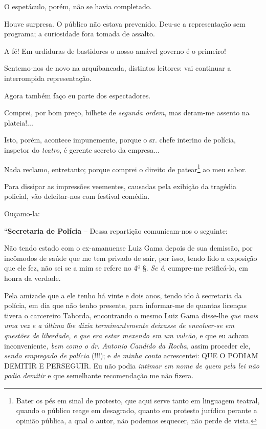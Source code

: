 O espetáculo, porém, não se havia completado.

Houve surpresa. O público não estava prevenido. Deu-se a representação
sem programa; a curiosidade fora tomada de assalto.

A fé! Em urdiduras de bastidores o nosso amável governo é o primeiro!

Sentemo-nos de novo na arquibancada, distintos leitores: vai continuar a
interrompida representação.

Agora também faço eu parte dos espectadores.

Comprei, por bom preço, bilhete de \emph{segunda ordem}, mas deram-me
assento na plateia!...

Isto, porém, acontece impunemente, porque o sr. chefe interino de
polícia, inspetor do \emph{teatro}, é gerente secreto da empresa...

Nada reclamo, entretanto; porque comprei o direito de patear\footnote{
  Bater os pés em sinal de protesto, que aqui serve tanto em linguagem
  teatral, quando o público reage em desagrado, quanto em protesto
  jurídico perante a opinião pública, a qual o autor, não podemos
  esquecer, não perde de vista.} ao meu sabor.

Para dissipar as impressões veementes, causadas pela exibição da
tragédia policial, vão deleitar-nos com festival comédia.

Ouçamo-la:

``\textbf{Secretaria de Polícia} -- Dessa repartição comunicam-nos o
seguinte:

Não tendo estado com o ex-amanuense Luiz Gama depois de sua demissão,
por incômodos de saúde que me tem privado de sair, por isso, tendo lido
a exposição que ele fez, não sei se a mim se refere no 4º §. \emph{Se
é}, cumpre-me retificá-lo, em honra da verdade.

Pela amizade que a ele tenho há vinte e dois anos, tendo ido à
secretaria da polícia, em dia que não tenho presente, para informar-me
de quantas licenças tivera o carcereiro Taborda, encontrando o mesmo
Luiz Gama disse-lhe \emph{que mais uma vez e a última lhe dizia
terminantemente deixasse de envolver-se em questões de liberdade, e que
era estar mexendo em um vulcão,} e que eu achava inconveniente\emph{,
bem como o dr. Antonio Candido da Rocha}, assim proceder ele,
\emph{sendo empregado de polícia} (!!!); e \emph{de minha conta}
acrescentei: QUE O PODIAM DEMITIR E PERSEGUIR. Eu não podia
\emph{intimar em nome de quem pela lei não podia demitir} e que
semelhante recomendação me não fizera.

